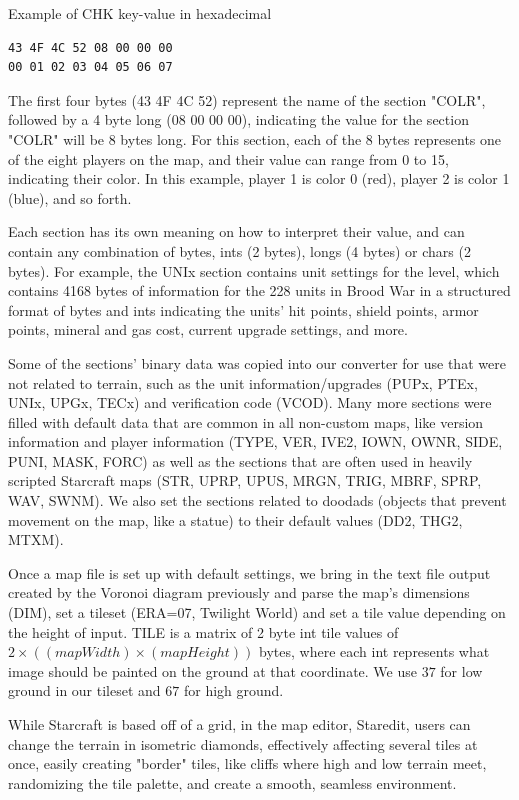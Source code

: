 \documentclass[letterpaper]{article}
\begin{document}
Example of CHK key-value in hexadecimal
\begin{verbatim}
43 4F 4C 52 08 00 00 00
00 01 02 03 04 05 06 07
\end{verbatim}

The first four bytes (43 4F 4C 52) represent the name of the section "COLR", followed by a 4 byte long (08 00 00 00), indicating the value for the section "COLR" will be 8 bytes long. For this section, each of the 8 bytes represents one of the eight players on the map, and their value can range from 0 to 15, indicating their color. In this example, player 1 is color 0 (red), player 2 is color 1 (blue), and so forth.

Each section has its own meaning on how to interpret their value, and can contain any combination of bytes, ints (2 bytes), longs (4 bytes) or chars (2 bytes). For example, the UNIx section contains unit settings for the level, which contains 4168 bytes of information for the 228 units in Brood War in a structured format of bytes and ints indicating the units' hit points, shield points, armor points, mineral and gas cost, current upgrade settings, and more.

Some of the sections' binary data was copied into our converter for use that were not related to terrain, such as the unit information/upgrades (PUPx, PTEx, UNIx, UPGx, TECx) and verification code (VCOD). Many more sections were filled with default data that are common in all non-custom maps, like version information and player information (TYPE, VER, IVE2, IOWN, OWNR, SIDE, PUNI, MASK, FORC) as well as the sections that are often used in heavily scripted Starcraft maps (STR, UPRP, UPUS, MRGN, TRIG, MBRF, SPRP, WAV, SWNM). We also set the sections related to doodads (objects that prevent movement on the map, like a statue) to their default values (DD2, THG2, MTXM).

Once a map file is set up with default settings, we bring in the text file output created by the Voronoi diagram previously and parse the map's dimensions (DIM), set a tileset (ERA=07, Twilight World) and set a tile value depending on the height of input. TILE is a matrix of 2 byte int tile values of $2 \times ((mapWidth)  \times (mapHeight))$ bytes, where each int represents what image should be painted on the ground at that coordinate. We use $37$ for low ground in our tileset and $67$ for high ground.

While Starcraft is based off of a grid, in the map editor, Staredit, users can change the terrain in isometric diamonds, effectively affecting several tiles at once, easily creating "border" tiles, like cliffs where high and low terrain meet, randomizing the tile palette, and create a smooth, seamless environment.
\end{document}

